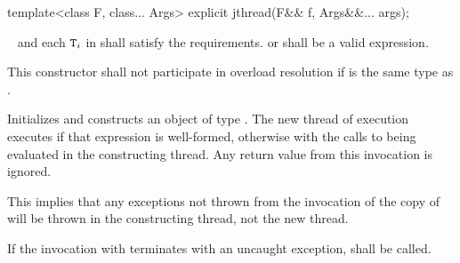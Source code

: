 %
\begin{itemdecl}
template<class F, class... Args> explicit jthread(F&& f, Args&&... args);
\end{itemdecl}
\begin{itemdescr}
  \pnum
\requires\  and each $\texttt{T}_i$ in  shall satisfy the
 requirements.
{\color{diffcolor}
        or
}
 shall be a valid expression.

\pnum\remarks
This constructor shall not participate in overload resolution if 
is the same type as .

\pnum\effects
{\color{diffcolor} Initializes  and
}
constructs an object of type .
The new thread of execution executes
{\color{diffcolor}
if that expression is well-formed,
otherwise
}
with the calls to
 being evaluated in the constructing thread.
Any return value from this invocation is ignored.
\begin{note} This implies that any exceptions not thrown from the invocation of the copy
of  will be thrown in the constructing thread, not the new thread. \end{note}
If the invocation
with 
terminates with an uncaught exception,  shall be called.


\end{itemdescr}
